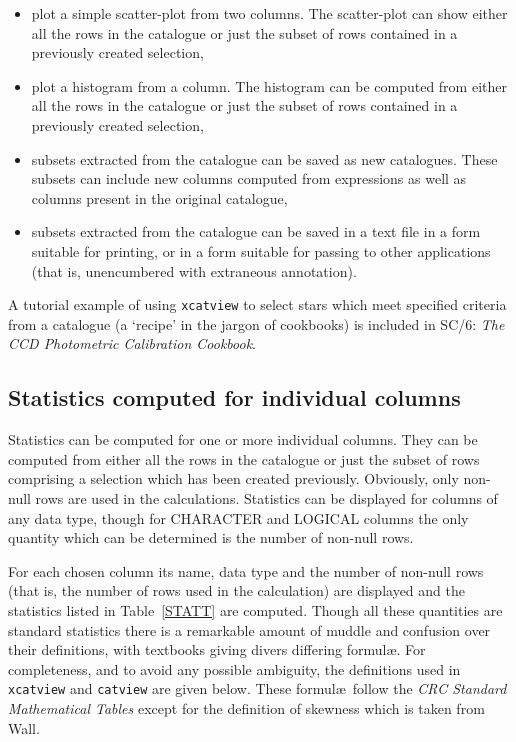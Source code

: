 \documentclass[twoside,11pt]{article}
\newcommand{\xref}[3]{#1}
\renewcommand{\_}{\texttt{\symbol{95}}}
\begin{document}
\begin{itemize}
  \item plot a simple scatter-plot from two columns.  The scatter-plot
   can show either all the rows in the catalogue or just the subset of
   rows contained in a previously created selection,

  \item plot a histogram from a column.  The histogram can be computed
   from either all the rows in the catalogue or just the subset of rows
   contained in a previously created selection,

  \item subsets extracted from the catalogue can be saved as new
   catalogues. These subsets can include new columns computed from
   expressions as well as columns present in the original catalogue,

  \item subsets extracted from the catalogue can be saved in a text file
   in a form suitable for printing, or in a form suitable for passing
   to other applications (that is, unencumbered with extraneous
   annotation).

\end{itemize}

A tutorial example of using {\tt xcatview} to select stars which meet
specified criteria from a catalogue (a `recipe' in the jargon of
cookbooks) is included in \xref{SC/6: {\it The CCD Photometric Calibration
Cookbook}}{sc6}{}\cite{SC6}.


\subsection{\label{STATS}Statistics computed for individual columns}

Statistics can be computed for one or more individual columns.  They can
be computed from either all the rows in the catalogue or just the subset
of rows comprising a selection which has been created previously.  Obviously,
only non-null rows are used in the calculations.  Statistics can be
displayed for columns of any data type, though for CHARACTER and LOGICAL
columns the only quantity which can be determined is the number of
non-null rows.

For each chosen column its name, data type and the number of non-null rows
(that is, the number of rows used in the calculation) are displayed and the
statistics listed in Table~\ref{STATT} are computed.  Though all these
quantities are standard statistics there is a remarkable amount of muddle
and confusion over their definitions, with textbooks giving divers
differing formul\ae.  For completeness, and to avoid any possible
ambiguity, the definitions used in {\tt xcatview} and {\tt catview} are
given below.  These formul\ae\ follow the {\it CRC Standard Mathematical
Tables}\/\cite{CRCMT} except for the definition of skewness which is taken
from Wall\cite{WALL79}.
\end{document}

